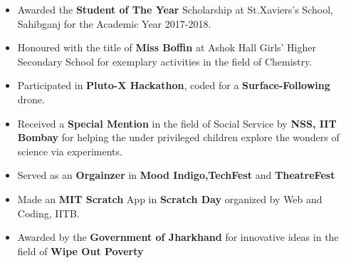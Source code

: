 \documentclass[letterpaper,11pt]{article}
\newcommand{\isep}{-2 pt}
\begin{document}
 \begin{itemize}\itemsep \isep
     \item Awarded the  \textbf{Student of The Year} Scholarship at St.Xaviers's School, Sahibganj for the Academic Year 2017-2018.
     \item Honoured with the title of \textbf{Miss Boffin} at Ashok Hall Girls' Higher Secondary School for exemplary activities in the field of Chemistry.
     \item Participated in \textbf{Pluto-X Hackathon}, coded for a \textbf{Surface-Following} drone.
     \item Received a \textbf{Special Mention} in the field of Social Service by \textbf{NSS, IIT Bombay} for  helping the under privileged children explore the wonders of science via experiments.
     \item Served as an \textbf{Orgainzer} in \textbf{Mood Indigo,TechFest} and \textbf{TheatreFest}
     \item Made an \textbf{MIT Scratch} App in \textbf{Scratch Day} organized by Web and Coding, IITB.
     \item Awarded by the \textbf{Government of Jharkhand} for innovative ideas in the field of \textbf{Wipe Out Poverty}
     
     
 \end{itemize}
 
 
 
 




 
\end{document}
